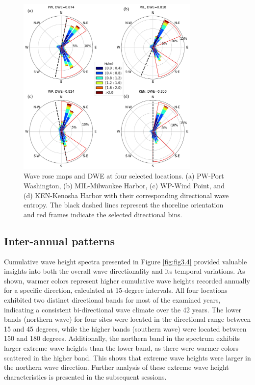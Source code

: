 \begin{figure}[htbp]
  \centering
  \includegraphics[width=0.8\textwidth]{chapter3/resources/figure3-3.jpg}
  \caption{Wave rose maps and DWE at four selected locations. (a) PW-Port Washington, (b) MIL-Milwaukee Harbor, (c) WP-Wind Point, and (d) KEN-Kenosha Harbor with their corresponding directional wave entropy. The black dashed lines represent the shoreline orientation and red frames indicate the selected directional bins.}
  \label{fig:fig3.3}
\end{figure}

\subsection{Inter-annual patterns}
\label{c3_Inter-annual patterns}
Cumulative wave height spectra presented in Figure \ref{fig:fig3.4} provided valuable insights into both the overall wave directionality and its temporal variations. As shown, warmer colors represent higher cumulative wave heights recorded annually for a specific direction, calculated at 15-degree intervals. All four locations exhibited two distinct directional bands for most of the examined years, indicating a consistent bi-directional wave climate over the 42 years. The lower bands (northern wave) for four sites were located in the directional range between 15 and 45 degrees, while the higher bands (southern wave) were located between 150 and 180 degrees. Additionally, the northern band in the spectrum exhibits larger extreme wave heights than the lower band, as there were warmer colors scattered in the higher band. This shows that extreme wave heights were larger in the northern wave direction. Further analysis of these extreme wave height characteristics is presented in the subsequent sessions.

